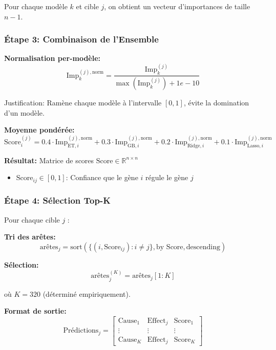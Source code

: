\documentclass[12pt,a4paper,french]{article}
\begin{document}
Pour chaque modèle $k$ et cible $j$, on obtient un vecteur d'importances de taille $n-1$.

\subsubsection{Étape 3: Combinaison de l'Ensemble}

\textbf{Normalisation per-modèle:}
\begin{equation}
\text{Imp}_k^{(j), \text{norm}} = \frac{\text{Imp}_k^{(j)}}{\max(\text{Imp}_k^{(j)}) + 1e-10}
\end{equation}

Justification: Ramène chaque modèle à l'intervalle $[0, 1]$, évite la domination d'un modèle.

\textbf{Moyenne pondérée:}
\begin{equation}
\text{Score}_i^{(j)} = 0.4 \cdot \text{Imp}_{\text{ET}, i}^{(j), \text{norm}} + 0.3 \cdot \text{Imp}_{\text{GB}, i}^{(j), \text{norm}} + 0.2 \cdot \text{Imp}_{\text{Ridge}, i}^{(j), \text{norm}} + 0.1 \cdot \text{Imp}_{\text{Lasso}, i}^{(j), \text{norm}}
\end{equation}

\textbf{Résultat:} Matrice de scores $\text{Score} \in \mathbb{R}^{n \times n}$
\begin{itemize}
    \item $\text{Score}_{ij} \in [0, 1]$: Confiance que le gène $i$ régule le gène $j$
\end{itemize}

\subsubsection{Étape 4: Sélection Top-K}

Pour chaque cible $j$ :

\textbf{Tri des arêtes:}
\begin{equation}
\text{arêtes}_j = \text{sort}(\{(i, \text{Score}_{ij}) : i \neq j\}, \text{by Score}, \text{descending})
\end{equation}

\textbf{Sélection:}
\begin{equation}
\text{arêtes}_j^{(K)} = \text{arêtes}_j[1:K]
\end{equation}

où $K = 320$ (déterminé empiriquement).

\textbf{Format de sortie:}
\begin{equation}
\text{Prédictions}_j = \begin{bmatrix}
\text{Cause}_1 & \text{Effect}_j & \text{Score}_1 \\
\vdots & \vdots & \vdots \\
\text{Cause}_K & \text{Effect}_j & \text{Score}_K
\end{bmatrix}
\end{equation}
\end{document}
